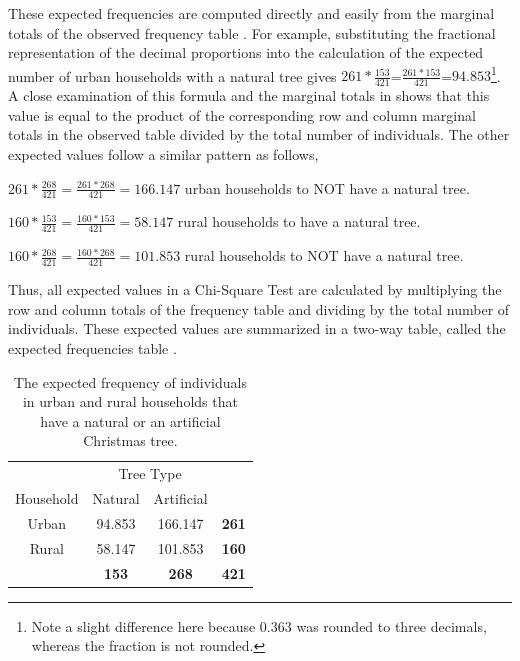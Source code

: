 \documentclass[10pt,openany]{book}\usepackage[]{graphicx}\usepackage[]{color}
\begin{document}
These expected frequencies are computed directly and easily from the marginal totals of the observed frequency table . For example, substituting the fractional representation of the decimal proportions into the calculation of the expected number of urban households with a natural tree gives $261*\frac{153}{421}$=$\frac{261*153}{421}$=$94.853$\footnote{Note a slight difference here because 0.363 was rounded to three decimals, whereas the fraction is not rounded.}. A close examination of this formula and the marginal totals in  shows that this value is equal to the product of the corresponding row and column marginal totals in the observed table divided by the total number of individuals. The other expected values follow a similar pattern as follows,
\begin{Itemize}
  \item $261*\frac{268}{421}=\frac{261*268}{421}=166.147$ urban households to NOT have a natural tree.
  \item $160*\frac{153}{421}=\frac{160*153}{421}=58.147$ rural households to have a natural tree.
  \item $160*\frac{268}{421}=\frac{160*268}{421}=101.853$ rural households to NOT have a natural tree.
\end{Itemize}

Thus, all expected values in a Chi-Square Test are calculated by multiplying the row and column totals of the frequency table and dividing by the total number of individuals. These expected values are summarized in a two-way table, called the expected frequencies table .

\begin{table}[htbp]
  \centering
  \caption{The expected frequency of individuals in urban and rural households that have a natural or an artificial Christmas tree.}\label{tab:ChiTreeExp}
    \begin{tabular}{c|c|c|c|}
      \multicolumn{1}{c}{} & \multicolumn{2}{c}{Tree Type} & \multicolumn{1}{c}{} \\
      \cline{2-3}
      Household & Natural & Artificial & \multicolumn{1}{c}{} \\
      \hline
      \multicolumn{1}{|c|}{Urban} & 94.853 & 166.147 & \textbf{261} \\
      \hline
      \multicolumn{1}{|c|}{Rural} & 58.147 & 101.853 & \textbf{160} \\
      \hline
       & \textbf{153} & \textbf{268} & \textbf{421} \\
      \cline{2-4}
    \end{tabular}
\end{table}
\end{document}
